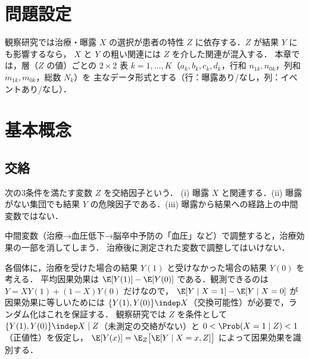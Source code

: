 
\section{問題設定}\label{sec:07-setting}
観察研究では治療・曝露 $X$ の選択が患者の特性 $Z$ に依存する．$Z$ が結果 $Y$ にも影響するなら，
$X$ と $Y$ の粗い関連には $Z$ を介した関連が混入する．
本章では，層（$Z$ の値）ごとの $2\times2$ 表 $k=1,\dots,K$（$a_k,b_k,c_k,d_k$，行和 $n_{1k},n_{0k}$，列和 $m_{1k},m_{0k}$，総数 $N_k$）を
主なデータ形式とする（行：曝露あり/なし，列：イベントあり/なし）．

\section{基本概念}\label{sec:07-basic}
\subsection{交絡}\label{subsec:07-confound}
\begin{teigi}[交絡因子]\label{def:07-confounder}
次の3条件を満たす変数 $Z$ を交絡因子という．
(i) 曝露 $X$ と関連する．(ii) 曝露がない集団でも結果 $Y$ の危険因子である．(iii) 曝露から結果への経路上の中間変数ではない．
\end{teigi}
\Youchui 中間変数（治療→血圧低下→脳卒中予防の「血圧」など）で調整すると，治療効果の一部を消してしまう．
治療後に測定された変数で調整してはいけない．

\begin{supbox}[補足：潜在結果による定式化]
各個体に，治療を受けた場合の結果 $Y(1)$ と受けなかった場合の結果 $Y(0)$ を考える．
平均因果効果は $\E[Y(1)]-\E[Y(0)]$ である．観測できるのは $Y=XY(1)+(1-X)Y(0)$ だけなので，
$\E[Y\mid X=1]-\E[Y\mid X=0]$ が因果効果に等しいためには $\{Y(1),Y(0)\}\indep X$（交換可能性）が必要で，ランダム化はこれを保証する．
観察研究では $Z$ を条件として $\{Y(1),Y(0)\}\indep X\mid Z$（未測定の交絡がない）と $0<\Prob(X=1\mid Z)<1$（正値性）を仮定し，
$\E[Y(x)]=\E_Z\bigl[\E[Y\mid X=x,Z]\bigr]$ によって因果効果を識別する．
\end{supbox}

